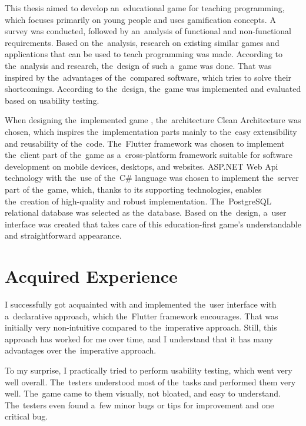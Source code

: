 \begin{conclusion}

This thesis aimed to develop an~educational game for teaching programming, which focuses primarily on young people and uses gamification concepts.
A survey was conducted, followed by an~analysis of functional and non-functional requirements.
Based on the~analysis, research on existing similar games and applications that can be used to teach programming was made.
According to the~analysis and research, the~design of such a~game was done.
That was inspired by the~advantages of the~compared software, which tries to solve their shortcomings.
According to the~design, the~game was implemented and evaluated based on usability testing.

When designing the~implemented game \myAppName{}, the~architecture Clean Architecture was chosen, which inspires the~implementation parts mainly to the~easy extensibility and reusability of the~code.
The~Flutter framework was chosen to implement the~client part of the~game as a~cross-platform framework suitable for software development on mobile devices, desktops, and websites.
ASP.NET Web Api technology with the~use of the~C\# language was chosen to implement the~server part of the~game, which, thanks to its supporting technologies, enables the~creation of high-quality and robust implementation.
The~PostgreSQL relational database was selected as the~database.
Based on the~design, a~user interface was created that takes care of this education-first game's understandable and straightforward appearance.

\section{Acquired Experience}

I successfully got acquainted with and implemented the~user interface with a~declarative approach, which the~Flutter framework encourages.
That was initially very non-intuitive compared to the~imperative approach.
Still, this approach has worked for me over time, and I understand that it has many advantages over the~imperative approach.

\pagebreak

To my surprise, I practically tried to perform usability testing, which went very well overall.
The~testers understood most of the~tasks and performed them very well.
The~game came to them visually, not bloated, and easy to understand.
The~testers even found a~few minor bugs or tips for improvement and one critical bug.


\end{conclusion}
